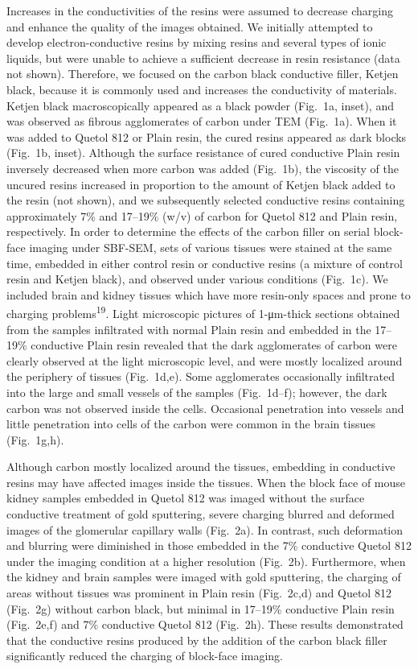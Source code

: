 \documentclass{article}
\begin{document}
Increases in the conductivities of the resins were assumed to decrease charging and enhance the quality of the images obtained. We initially attempted to develop electron-conductive resins by mixing resins and several types of ionic liquids, but were unable to achieve a sufficient decrease in resin resistance (data not shown). Therefore, we focused on the carbon black conductive filler, Ketjen black, because it is commonly used and increases the conductivity of materials. Ketjen black macroscopically appeared as a black powder (Fig.~1a, inset), and was observed as fibrous agglomerates of carbon under TEM (Fig.~1a). When it was added to Quetol 812 or Plain resin, the cured resins appeared as dark blocks (Fig.~1b, inset). Although the surface resistance of cured conductive Plain resin inversely decreased when more carbon was added (Fig.~1b), the viscosity of the uncured resins increased in proportion to the amount of Ketjen black added to the resin (not shown), and we subsequently selected conductive resins containing approximately 7\% and 17–19\% (w/v) of carbon for Quetol 812 and Plain resin, respectively. In order to determine the effects of the carbon filler on serial block-face imaging under SBF-SEM, sets of various tissues were stained at the same time, embedded in either control resin or conductive resins (a mixture of control resin and Ketjen black), and observed under various conditions (Fig.~1c). We included brain and kidney tissues which have more resin-only spaces and prone to charging problems\textsuperscript{19}. Light microscopic pictures of 1-μm-thick sections obtained from the samples infiltrated with normal Plain resin and embedded in the 17–19\% conductive Plain resin revealed that the dark agglomerates of carbon were clearly observed at the light microscopic level, and were mostly localized around the periphery of tissues (Fig.~1d,e). Some agglomerates occasionally infiltrated into the large and small vessels of the samples (Fig.~1d–f); however, the dark carbon was not observed inside the cells. Occasional penetration into vessels and little penetration into cells of the carbon were common in the brain tissues (Fig.~1g,h).

Although carbon mostly localized around the tissues, embedding in conductive resins may have affected images inside the tissues. When the block face of mouse kidney samples embedded in Quetol 812 was imaged without the surface conductive treatment of gold sputtering, severe charging blurred and deformed images of the glomerular capillary walls (Fig.~2a). In contrast, such deformation and blurring were diminished in those embedded in the 7\% conductive Quetol 812 under the imaging condition at a higher resolution (Fig.~2b). Furthermore, when the kidney and brain samples were imaged with gold sputtering, the charging of areas without tissues was prominent in Plain resin (Fig.~2c,d) and Quetol 812 (Fig.~2g) without carbon black, but minimal in 17–19\% conductive Plain resin (Fig.~2e,f) and 7\% conductive Quetol 812 (Fig.~2h). These results demonstrated that the conductive resins produced by the addition of the carbon black filler significantly reduced the charging of block-face imaging.
\end{document}
